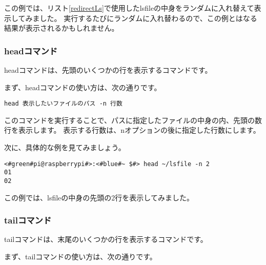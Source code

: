 この例では、リスト\ref{redirectLs}で使用したlsfileの中身をランダムに入れ替えて表示してみました。
実行するたびにランダムに入れ替わるので、この例とはなる結果が表示されるかもしれません。

\begin{tcolorbox}[title=\useOmetoi]
    \begin{enumerate}
    \end{enumerate}
\end{tcolorbox}

\subsubsection{headコマンド}
headコマンドは、先頭のいくつかの行を表示するコマンドです。

まず、headコマンドの使い方は、次の通りです。

\begin{lstlisting}[caption=headコマンドの使い方, label=head_usage]
head 表示したいファイルのパス -n 行数
\end{lstlisting}

このコマンドを実行することで、パスに指定したファイルの中身の内、先頭の数行を表示します。
表示する行数は、nオプションの後に指定した行数にします。

次に、具体的な例を見てみましょう。

\begin{lstlisting}[caption=headコマンドの実行例, label=shuf_example]
<#green#pi@raspberrypi#>:<#blue#~ $#> head ~/lsfile -n 2
01
02
\end{lstlisting}

この例では、lsfileの中身の先頭の2行を表示してみました。

\begin{tcolorbox}[title=\useOmetoi]
    \begin{enumerate}
    \end{enumerate}
\end{tcolorbox}

\subsubsection{tailコマンド}
tailコマンドは、末尾のいくつかの行を表示するコマンドです。

まず、tailコマンドの使い方は、次の通りです。

